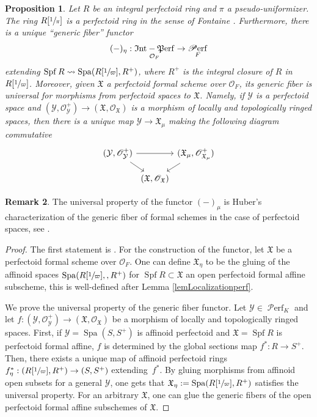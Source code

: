\documentclass[11pt]{article}
\numberwithin{equation}{section}
\newtheorem{prop}{Proposition}[section]
\theoremstyle{definition}
\newtheorem{remark}[prop]{Remark}
\newcommand{\n}[1]{\mathcal{#1}}
\newcommand{\f}[1]{\mathfrak{#1}}
\newcommand{\s}[1]{\mathscr{#1}}
\DeclareMathOperator{\Spf}{Spf}
\DeclareMathOperator{\Spa}{Spa}
\DeclareMathOperator{\Intperf}{\f{I}nt\textup{-}\f{P}erf}
\DeclareMathOperator{\Perf}{\s{P}erf}
\begin{document}
\begin{prop}
\label{PropgenericFiberFunctor}
Let $R$ be an integral perfectoid ring and $\pi$ a pseudo-uniformizer. The ring $R[\sfrac{1}{\pi}]$ is a perfectoid ring in the sense of Fontaine \cite{MR3087355}. Furthermore, there is a unique ``generic fiber'' functor
\[
(-)_{\eta}: \Intperf_{\n{O}_F} \to \Perf_F
\]
extending $\Spf R \leadsto \Spa(R[\sfrac{1}{\varpi}], R^+)$, where $R^+$ is the integral closure of $R$ in $R[\sfrac{1}{\varpi}]$. Moreover, given $\f{X}$ a perfectoid formal scheme over $\n{O}_F$, its generic fiber is universal for morphisms from perfectoid spaces to $\f{X}$. Namely, if $\n{Y}$ is a perfectoid space and $(\n{Y}, \s{O}^+_{\n{Y}})\to (\f{X}, \s{O}_{\f{X}})$ is a morphism of locally and topologically ringed spaces, then there is a unique map $\n{Y}\to \f{X}_{\mu}$ making the following diagram commutative
\[
\begin{tikzcd}[row sep= 10pt, column sep =1pt]
(\n{Y}, \s{O}_{\n{Y}}^+)	\ar[rr]\ar[rd] & & (\f{X}_{\mu}, \s{O}_{\f{X}_{\mu}}^+)\ar[ld] \\
& (\f{X}, \s{O}_{\f{X}}) &
\end{tikzcd}
\]
\end{prop}

\begin{remark}
The universal property of the functor $(-)_{\mu}$ is Huber's characterization of the generic fiber of formal schemes in the case of perfectoid spaces, see \cite[Prop.\,4.1]{MR1306024}.
\end{remark}

\begin{proof}
The first statement is \cite[Lem.\,3.21]{MR3905467}. For the construction of the functor, let $\f{X}$ be a perfectoid formal scheme over $\n{O}_F$. One can define $\f{X}_{\eta}$ to be the gluing of the affinoid spaces $\Spa(R[\sfrac{1}{\varpi}],, R^+)$ for $\Spf R\subset \f{X}$ an open perfectoid formal affine subscheme, this is well-defined after Lemma \ref{lemLocalizationperf}.

We prove the universal property of the generic fiber functor. Let $\n{Y}\in \Perf_K$ and let $f:(\n{Y}, \s{O}^+_{\n{Y}})\to (\f{X}, \s{O}_{\f{X}})$ be a morphism of locally and topologically ringed spaces. First, if $\n{Y}=\Spa(S,S^+)$ is affinoid perfectoid and $\f{X}=\Spf R$ is perfectoid formal affine, $f$ is determined by the global sections map $f^*: R\to S^+$. Then, there exists a unique map of affinoid perfectoid rings $f^*_{\eta}: (R[\sfrac{1}{\varpi}], R^+)\to (S,S^+)$ extending~$f^*$. By gluing morphisms from affinoid open subsets for a general $\n{Y}$, one gets that $\f{X}_\eta:= \Spa(R[\sfrac{1}{\varpi}], R^+)$ satisfies the universal property. For an arbitrary $\f{X}$, one can glue the generic fibers of the open perfectoid formal affine subschemes of $\f{X}$.
\end{proof}
\end{document}
